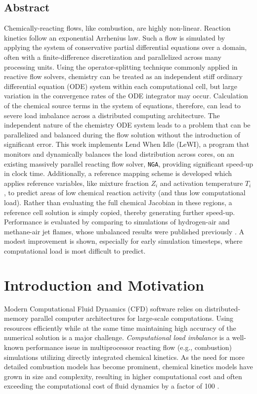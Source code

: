 \documentclass[letterpaper,twocolumn,10pt]{article}
\begin{document}
\subsection*{Abstract}
Chemically-reacting flows, like combustion, are highly non-linear. Reaction kinetics follow an exponential Arrhenius law. Such a flow is simulated by applying the system of conservative partial differential equations over a domain, often with a finite-difference discretization and parallelized across many processing units. Using the operator-splitting technique commonly applied in reactive flow solvers, chemistry can be treated as an independent stiff ordinary differential equation (ODE) system within each computational cell, but large variation in the convergence rates of the ODE integrator may occur. Calculation of the chemical source terms in the system of equations, therefore, can lead to severe load imbalance across a distributed computing architecture. The independent nature of the chemistry ODE system leads to a problem that can be parallelized and balanced during the flow solution without the introduction of significant error. This work implements Lend When Idle (LeWI), a program that monitors and dynamically balances the load distribution across cores, on an existing massively parallel reacting flow solver, \texttt{NGA}, providing significant speed-up in clock time. Additionally, a reference mapping scheme is developed which applies reference variables, like mixture fraction $Z_i$ and activation temperature $T_i$, to predict areas of low chemical reaction activity (and thus low computational load). Rather than evaluating the full chemical Jacobian in these regions, a reference cell solution is simply copied, thereby generating further speed-up. Performance is evaluated by comparing to simulations of hydrogen-air and methane-air jet flames, whose unbalanced results were published previously \cite{LACEY2021,Lacey_thesis}. A modest improvement is shown, especially for early simulation timesteps, where computational load is most difficult to predict.

\section{Introduction and Motivation}

Modern Computational Fluid Dynamics (CFD) software relies on distributed-memory parallel computer architectures for large-scale computations. Using resources efficiently while at the same time maintaining high accuracy of the numerical solution is a major challenge. \emph{Computational load imbalance} is a well-known performance issue in multiprocessor reacting flow (e.g., combustion) simulations utilizing directly integrated chemical kinetics. As the need for more detailed combustion models has become prominent, chemical kinetics models have grown in size and complexity, resulting in higher computational cost and often exceeding the computational cost of fluid dynamics by a factor of 100 \cite{Law_book}. 
\end{document}
